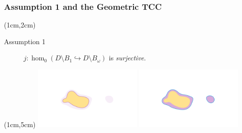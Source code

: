 \begin{frame}
  \frametitle{{\small Assumption 1 and the Geometric TCC}}

  \begin{textblock*}{11cm}(1cm,2cm)
    \begin{small}
      \begin{description}
        \item[Assumption 1] $j : \hom_0(D\setminus B_{1}\hookrightarrow D\setminus B_\omega)$ is \emph{surjective}.
      \end{description}

    \end{small}
  \end{textblock*}

  \begin{textblock*}{11cm}(1cm,5cm)
    \includegraphics[trim=300 150 200 200, clip, width=0.4\textwidth]{../scripts/figures/surf/ass1_D_top.png}\hspace{6ex}
    \includegraphics[trim=300 150 200 200, clip, width=0.4\textwidth]{../scripts/figures/surf/ass1_C_top.png}
  \end{textblock*}

\end{frame}


